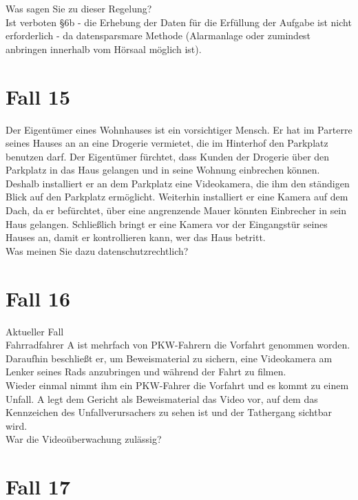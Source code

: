 \documentclass[a4paper,10pt]{scrartcl}
\begin{document}
Was sagen Sie zu dieser Regelung? \\

Ist verboten §6b - die Erhebung der Daten für die Erfüllung der Aufgabe
ist nicht erforderlich - da datensparsmare Methode (Alarmanlage oder 
zumindest anbringen innerhalb vom Hörsaal möglich ist).


\section{Fall 15}

Der Eigentümer eines Wohnhauses ist ein vorsichtiger Mensch. Er hat im Parterre 
seines Hauses an an eine Drogerie vermietet, die im Hinterhof den Parkplatz 
benutzen darf. Der Eigentümer fürchtet, dass Kunden der Drogerie über den 
Parkplatz in das Haus gelangen und in seine Wohnung einbrechen können. 
Deshalb installiert er an dem Parkplatz eine Videokamera, die ihm den ständigen 
Blick auf den Parkplatz ermöglicht. Weiterhin installiert er eine Kamera auf dem 
Dach, da er befürchtet, über eine angrenzende Mauer könnten Einbrecher in sein
Haus gelangen. Schließlich bringt er eine Kamera vor der Eingangstür seines 
Hauses an, damit er kontrollieren kann, wer das Haus betritt. \\

Was meinen Sie dazu datenschutzrechtlich?

\section{Fall 16}

Aktueller Fall\\
Fahrradfahrer A ist mehrfach von PKW-Fahrern die Vorfahrt genommen 
worden. Daraufhin beschließt er, um Beweismaterial zu sichern, eine 
Videokamera am Lenker seines Rads anzubringen und während der 
Fahrt zu filmen. \\

Wieder einmal nimmt ihm ein PKW-Fahrer die Vorfahrt und es kommt zu 
einem Unfall. A legt dem Gericht als Beweismaterial das Video vor, auf 
dem das Kennzeichen des Unfallverursachers zu sehen ist und der 
Tathergang sichtbar wird.\\

War die Videoüberwachung zulässig?


\section{Fall 17}
\end{document}
